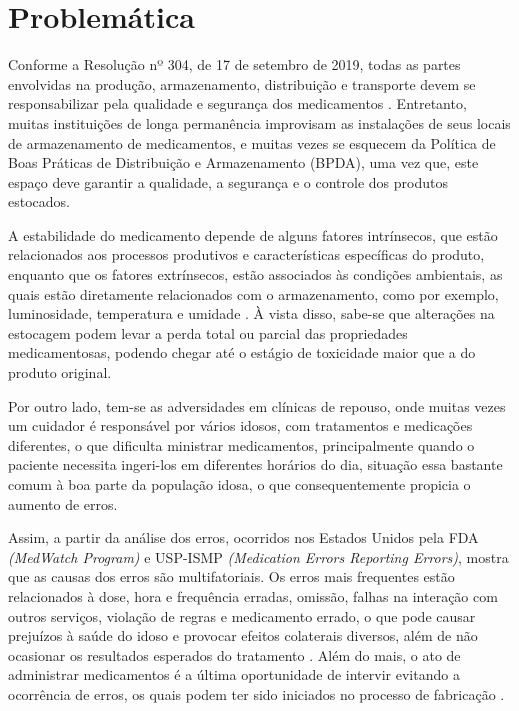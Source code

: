 \chapter[Problemática]{Problemática}

Conforme a Resolução nº 304, de 17 de setembro de 2019, todas as partes envolvidas na produção, armazenamento, distribuição e transporte devem se responsabilizar pela qualidade e segurança dos medicamentos \cite{RDC_304}. Entretanto, muitas instituições de longa permanência improvisam as instalações de seus locais de armazenamento de medicamentos,  e muitas vezes se esquecem da Política de Boas Práticas de Distribuição e Armazenamento (BPDA), uma vez que, este espaço deve garantir a qualidade, a segurança e o controle dos produtos estocados.

A estabilidade do medicamento depende de alguns fatores intrínsecos, que estão relacionados aos processos produtivos e características específicas do produto, enquanto que os fatores extrínsecos, estão associados às condições ambientais, as quais estão diretamente relacionados com o armazenamento, como por exemplo, luminosidade, temperatura e umidade \cite{Souza_2018}. À vista disso, sabe-se que alterações na estocagem podem levar a perda total ou parcial das propriedades medicamentosas, podendo chegar até o estágio de toxicidade maior que a do produto original.


Por outro lado, tem-se as adversidades em clínicas de repouso, onde muitas vezes um cuidador é responsável por vários idosos, com tratamentos e medicações diferentes, o que dificulta ministrar medicamentos, principalmente quando o paciente necessita ingeri-los em diferentes horários do dia, situação essa bastante comum à boa parte da população idosa, o que consequentemente propicia o aumento de erros.


Assim, a partir da análise dos erros, ocorridos nos Estados Unidos pela FDA \textit{(MedWatch Program)} e USP-ISMP \textit{(Medication Errors Reporting Errors)}, mostra que as causas dos erros são multifatoriais. Os erros mais frequentes estão relacionados à dose, hora e frequência erradas, omissão, falhas na interação com outros serviços, violação de regras e medicamento errado, o que pode causar prejuízos à saúde do idoso e provocar efeitos colaterais diversos, além de não ocasionar os resultados esperados do tratamento \cite{Freire_2009}. Além do mais, o ato de administrar medicamentos é a última oportunidade de intervir evitando a ocorrência de erros, os quais podem ter sido iniciados no processo de fabricação \cite{Azevedo_2011}.

